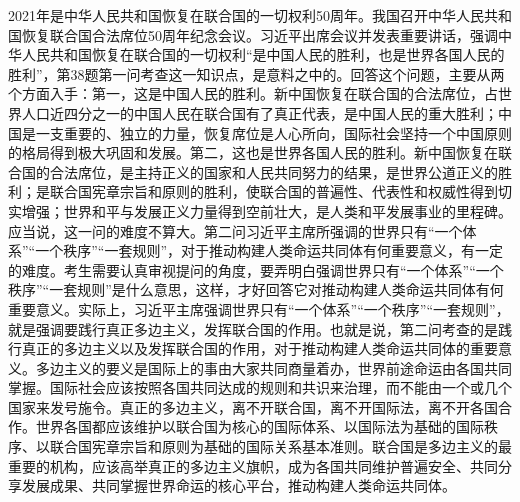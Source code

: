 \documentclass[UTF8,11pt]{ctexart}
\begin{document}
2021年是中华人民共和国恢复在联合国的一切权利50周年。我国召开中华人民共和国恢复联合国合法席位50周年纪念会议。习近平出席会议并发表重要讲话，强调中华人民共和国恢复在联合国的一切权利“是中国人民的胜利，也是世界各国人民的胜利”，第38题第一问考查这一知识点，是意料之中的。回答这个问题，主要从两个方面入手：第一，这是中国人民的胜利。新中国恢复在联合国的合法席位，占世界人口近四分之一的中国人民在联合国有了真正代表，是中国人民的重大胜利；中国是一支重要的、独立的力量，恢复席位是人心所向，国际社会坚持一个中国原则的格局得到极大巩固和发展。第二，这也是世界各国人民的胜利。新中国恢复在联合国的合法席位，是主持正义的国家和人民共同努力的结果，是世界公道正义的胜利；是联合国宪章宗旨和原则的胜利，使联合国的普遍性、代表性和权威性得到切实增强；世界和平与发展正义力量得到空前壮大，是人类和平发展事业的里程碑。应当说，这一问的难度不算大。第二问习近平主席所强调的世界只有“一个体系”“一个秩序”“一套规则”，对于推动构建人类命运共同体有何重要意义，有一定的难度。考生需要认真审视提问的角度，要弄明白强调世界只有“一个体系”“一个秩序”“一套规则”是什么意思，这样，才好回答它对推动构建人类命运共同体有何重要意义。实际上，习近平主席强调世界只有“一个体系”“一个秩序”“一套规则”，就是强调要践行真正多边主义，发挥联合国的作用。也就是说，第二问考查的是践行真正的多边主义以及发挥联合国的作用，对于推动构建人类命运共同体的重要意义。多边主义的要义是国际上的事由大家共同商量着办，世界前途命运由各国共同掌握。国际社会应该按照各国共同达成的规则和共识来治理，而不能由一个或几个国家来发号施令。真正的多边主义，离不开联合国，离不开国际法，离不开各国合作。世界各国都应该维护以联合国为核心的国际体系、以国际法为基础的国际秩序、以联合国宪章宗旨和原则为基础的国际关系基本准则。联合国是多边主义的最重要的机构，应该高举真正的多边主义旗帜，成为各国共同维护普遍安全、共同分享发展成果、共同掌握世界命运的核心平台，推动构建人类命运共同体。
\end{document}
